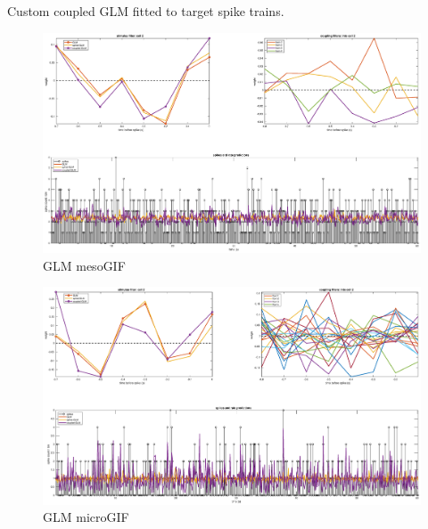 \documentclass[mphil,deptreport,ianc]{infthesis} %
\begin{document}

Custom coupled GLM fitted to target spike trains.

\begin{figure}
    \centering
    \includegraphics[width=0.9\columnwidth]{figures/matlab/export_GLM_filters_pred_bin_size_0_1_cell_2_target_GT_model_mesoGIF_N_4.eps}
    \caption{GLM mesoGIF}
    \label{fig:GLM_mesoGIF}
\end{figure}

\begin{figure}
    \centering
    \includegraphics[width=0.9\columnwidth]{figures/matlab/export_GLM_filters_pred_bin_size_0_1_cell_2_target_GT_model_microGIF_N_21.eps}
    \caption{GLM microGIF}
    \label{fig:GLM_microGIF}
\end{figure}
\end{document}
